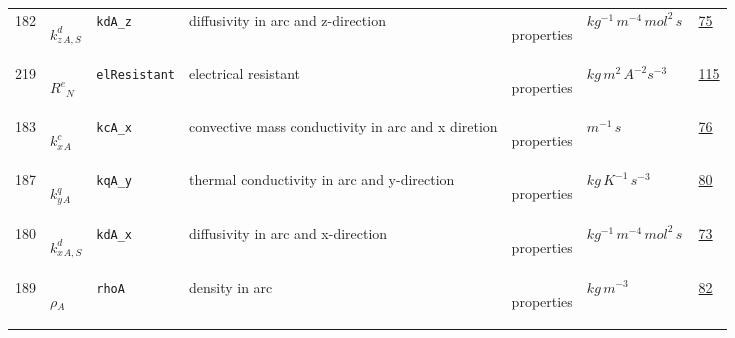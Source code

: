 \begin{longtable}{|p{1cm}|p{2.5cm}|p{4.5cm}|p{8cm}|p{3.0cm}|p{3cm}|p{1cm}|}
                 \\
            182
             & \hypertarget{"v:182"}{ $ {{k^d_z}}{_{A, S}} $}
             & \verb|kdA_z|
             & diffusivity in arc and z-direction
             & \begin{lay}properties \end{lay}
             & $ kg^{-1} \,m^{-4} \,mol^{2} \,s \, $
             &                 \hyperlink{"e:75"}{ 75 }
                 \\
            219
             & \hypertarget{"v:219"}{ $ {{R^e}}{_{N}} $}
             & \verb|elResistant|
             & electrical resistant
             & \begin{lay}properties \end{lay}
             & $ kg \,m^{2} \,A^{-2} s^{-3} \, $
             &                 \hyperlink{"e:115"}{ 115 }
                 \\
            183
             & \hypertarget{"v:183"}{ $ {{k^c_x}}{_{A}} $}
             & \verb|kcA_x|
             & convective mass conductivity in arc and x diretion
             & \begin{lay}properties \end{lay}
             & $ m^{-1} \,s \, $
             &                 \hyperlink{"e:76"}{ 76 }
                 \\
            187
             & \hypertarget{"v:187"}{ $ {{k^q_y}}{_{A}} $}
             & \verb|kqA_y|
             & thermal conductivity in arc and y-direction
             & \begin{lay}properties \end{lay}
             & $ kg \,K^{-1} \,s^{-3} \, $
             &                 \hyperlink{"e:80"}{ 80 }
                 \\
            180
             & \hypertarget{"v:180"}{ $ {{k^d_x}}{_{A, S}} $}
             & \verb|kdA_x|
             & diffusivity in arc and x-direction
             & \begin{lay}properties \end{lay}
             & $ kg^{-1} \,m^{-4} \,mol^{2} \,s \, $
             &                 \hyperlink{"e:73"}{ 73 }
                 \\
            189
             & \hypertarget{"v:189"}{ $ {{\rho}}{_{A}} $}
             & \verb|rhoA|
             & density in arc
             & \begin{lay}properties \end{lay}
             & $ kg \,m^{-3} \, $
             &                 \hyperlink{"e:82"}{ 82 }

\end{longtable}
